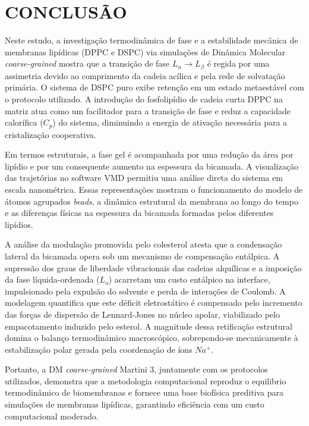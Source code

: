 \section{CONCLUSÃO}

Neste estudo, a investigação termodinâmica de fase e a estabilidade mecânica de membranas lipídicas (DPPC e DSPC) via simulações de Dinâmica Molecular \textit{coarse-grained} mostra que a transição de fase $L_{\alpha} \rightarrow L_{\beta}$ é regida por uma assimetria devido ao comprimento da cadeia acílica e pela rede de solvatação primária. O sistema de DSPC puro exibe retenção em um estado metaestável com o protocolo utilizado. A introdução do fosfolipídio de cadeia curta DPPC na matriz atua como um facilitador para a transição de fase e reduz a capacidade calorífica ($C_p$) do sistema, diminuindo a energia de ativação necessária para a cristalização cooperativa.

Em termos estruturais, a fase gel é acompanhada por uma redução da área por lipídio e por um consequente aumento na espessura da bicamada. A visualização das trajetórias no software VMD permitiu uma análise direta do sistema em escala nanométrica. Essas representações mostram o funcionamento do modelo de átomos agrupados \textit{beads}, a dinâmica estrutural da membrana ao longo do tempo e as diferenças físicas na espessura da bicamada formadas pelos diferentes lipídios.

A análise da modulação promovida pelo colesterol atesta que a condensação lateral da bicamada opera sob um mecanismo de compensação entálpica. A supressão dos graus de liberdade vibracionais das cadeias alquílicas e a imposição da fase líquida-ordenada ($L_o$) acarretam um custo entálpico na interface, impulsionado pela expulsão do solvente e perda de interações de Coulomb. A modelagem quantifica que este déficit eletrostático é compensado pelo incremento das forças de dispersão de Lennard-Jones no núcleo apolar, viabilizado pelo empacotamento induzido pelo esterol. A magnitude dessa retificação estrutural domina o balanço termodinâmico macroscópico, sobrepondo-se mecanicamente à estabilização polar gerada pela coordenação de íons $Na^+$.

Portanto, a DM \textit{coarse-grained} Martini 3, juntamente com os protocolos utilizados, demonstra que a metodologia computacional reproduz o equilibrio termodinâmico de biomembranas e fornece uma base biofísica preditiva para simulações de membranas lipídicas, garantindo eficiência com um custo computacional moderado.
